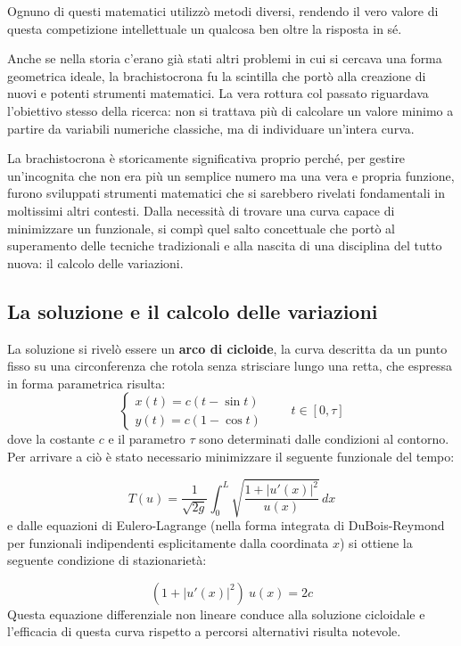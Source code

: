 \documentclass[a4paper,12pt]{article} %
\begin{document}
Ognuno di questi matematici utilizzò metodi diversi, rendendo il vero valore di questa competizione intellettuale un qualcosa ben oltre la risposta in sé.

Anche se nella storia c'erano già stati altri problemi in cui si cercava una forma geometrica ideale, la brachistocrona fu la scintilla che portò alla creazione di nuovi e potenti strumenti matematici. La vera rottura col passato riguardava l'obiettivo stesso della ricerca: non si trattava più di calcolare un valore minimo a partire da variabili numeriche classiche, ma di individuare un'intera curva.

La brachistocrona è storicamente significativa proprio perché, per gestire un'incognita che non era più un semplice numero ma una vera e propria funzione, furono sviluppati strumenti matematici che si sarebbero rivelati fondamentali in moltissimi altri contesti. Dalla necessità di trovare una curva capace di minimizzare un funzionale, si compì quel salto concettuale che portò al superamento delle tecniche tradizionali e alla nascita di una disciplina del tutto nuova: il calcolo delle variazioni.

\subsection{La soluzione e il calcolo delle variazioni}

La soluzione si rivelò essere un \textbf{arco di cicloide}, la curva descritta da un punto fisso su una circonferenza che rotola senza strisciare lungo una retta, che espressa in forma parametrica risulta:
\vspace{0.5em}
\[
    \begin{cases}
        x(t) = c(t - \sin t) \\
        y(t) = c(1 - \cos t)
    \end{cases}
    \qquad t \in [0, \tau]
\]
dove la costante $c$ e il parametro $\tau$ sono determinati dalle condizioni al contorno.
\vspace{0.5em}
\newline
Per arrivare a ciò è stato necessario minimizzare il seguente funzionale del tempo:

\[
    T(u) = \frac{1}{\sqrt{2g}} \int_{0}^{L} \sqrt{\frac{1 + |u'(x)|^2}{u(x)}} \, dx
\]
e dalle equazioni di Eulero-Lagrange (nella forma integrata di DuBois-Reymond per funzionali indipendenti esplicitamente dalla coordinata $x$) si ottiene la seguente condizione di stazionarietà:

\[
    (1 + |u'(x)|^2) \ u(x) = 2c
\]
Questa equazione differenziale non lineare conduce alla soluzione cicloidale e l'efficacia di questa curva rispetto a percorsi alternativi risulta notevole.
\end{document}

